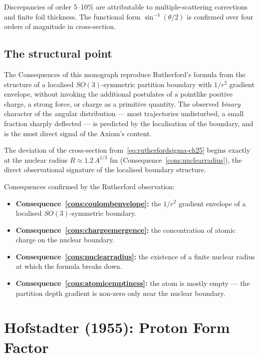 Discrepancies of order 5--10\% are attributable to multiple-scattering
corrections and finite foil thickness.  The functional form
$\sin^{-4}(\theta/2)$ is confirmed over four orders of magnitude in
cross-section.

\subsection{The structural point}

The Consequences of this monograph reproduce Rutherford's formula from the
structure of a localised $SO(3)$-symmetric partition boundary with
$1/r^{2}$ gradient envelope, without invoking the additional postulates of
a pointlike positive charge, a strong force, or charge as a primitive
quantity.  The observed \emph{binary} character of the angular
distribution --- most trajectories undisturbed, a small fraction sharply
deflected --- is predicted by the localisation of the boundary, and is the
most direct signal of the Axiom's content.

The deviation of the cross-section from~\eqref{eq:rutherfordsigma-ch25}
begins exactly at the nuclear radius $R \approx 1.2\,A^{1/3}$ fm
(Consequence~\ref{cons:nuclearradius}), the direct observational signature
of the localised boundary structure.

Consequences confirmed by the Rutherford observation:
\begin{itemize}
  \item \textbf{Consequence~\ref{cons:coulombenvelope}:}
    the $1/r^{2}$ gradient envelope of a localised $SO(3)$-symmetric boundary.
  \item \textbf{Consequence~\ref{cons:chargeemergence}:}
    the concentration of atomic charge on the nuclear boundary.
  \item \textbf{Consequence~\ref{cons:nuclearradius}:}
    the existence of a finite nuclear radius at which the formula breaks down.
  \item \textbf{Consequence~\ref{cons:atomicemptiness}:}
    the atom is mostly empty --- the partition depth gradient is
    non-zero only near the nuclear boundary.
\end{itemize}

\section{Hofstadter (1955): Proton Form Factor}
\label{sec:hofstadter-ch25}

